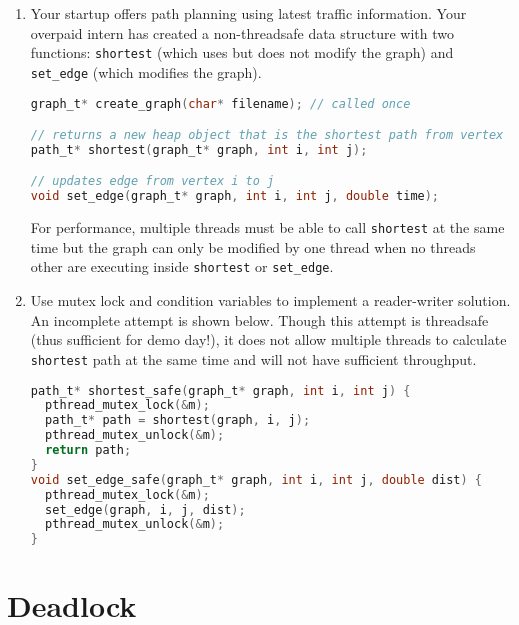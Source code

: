 \begin{enumerate}
\item Your startup offers path planning using latest traffic information. Your overpaid intern has created a non-threadsafe data structure with two functions: \texttt{shortest} (which uses but does not modify the graph) and \texttt{set\_edge} (which modifies the graph).

\begin{lstlisting}[language=C]
graph_t* create_graph(char* filename); // called once

// returns a new heap object that is the shortest path from vertex i to j
path_t* shortest(graph_t* graph, int i, int j);

// updates edge from vertex i to j
void set_edge(graph_t* graph, int i, int j, double time);

\end{lstlisting}

For performance, multiple threads must be able to call \texttt{shortest} at the same time but the graph can only be modified by one thread when no threads other are executing inside \texttt{shortest} or \texttt{set\_edge}.

\item Use mutex lock and condition variables to implement a reader-writer solution. An incomplete attempt is shown below. Though this attempt is threadsafe (thus sufficient for demo day!), it does not allow multiple threads to calculate \texttt{shortest} path at the same time and will not have sufficient throughput.

\begin{lstlisting}[language=C]
path_t* shortest_safe(graph_t* graph, int i, int j) {
  pthread_mutex_lock(&m);
  path_t* path = shortest(graph, i, j);
  pthread_mutex_unlock(&m);
  return path;
}
void set_edge_safe(graph_t* graph, int i, int j, double dist) {
  pthread_mutex_lock(&m);
  set_edge(graph, i, j, dist);
  pthread_mutex_unlock(&m);
}
\end{lstlisting}

\end{enumerate}

\section{Deadlock}


